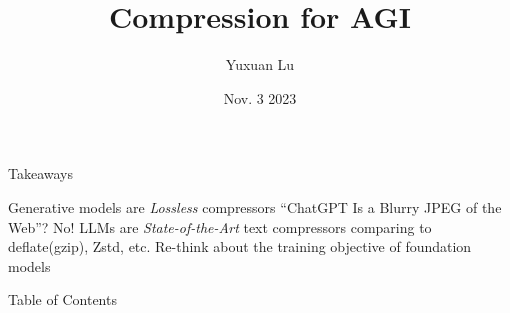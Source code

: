 \documentclass[scheme=plain]{ctexbeamer}
\title{Compression for AGI}
\author{Yuxuan Lu}
\institute{Northeastern Human-Centered AI Lab}
\date{Nov. 3 2023}
\begin{document}
\maketitle

\begin{frame}{Takeaways}
    \begin{outline}
        \1 Generative models are \emph{Lossless} compressors
            \2 ``ChatGPT Is a Blurry JPEG of the Web''? No!
        \1 LLMs are \emph{State-of-the-Art} text compressors
            \2 comparing to deflate(gzip), Zstd, etc.
        \1 Re-think about the training objective of foundation models
    \end{outline}
\end{frame}

\begin{frame}{Table of Contents}
    \tableofcontents
\end{frame}
\end{document}
